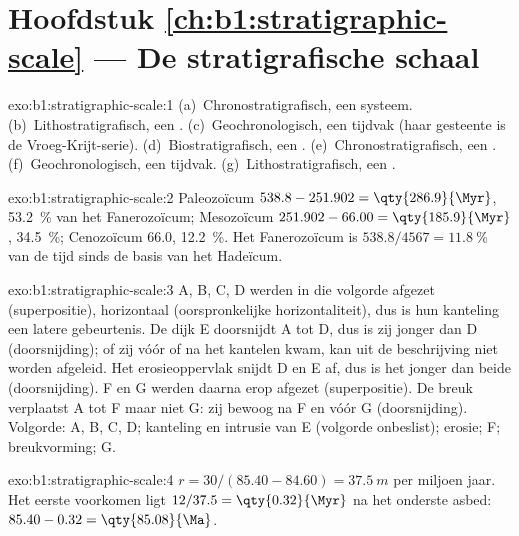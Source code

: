 \section*{Hoofdstuk \ref{ch:b1:stratigraphic-scale} --- De stratigrafische schaal}

\begin{solution}{exo:b1:stratigraphic-scale:1}
(a)~Chronostratigrafisch, een systeem. (b)~Lithostratigrafisch, een .
(c)~Geochronologisch, een tijdvak (haar gesteente is de Vroeg-Krijt-serie).
(d)~Biostratigrafisch, een . (e)~Chronostratigrafisch, een .
(f)~Geochronologisch, een tijdvak. (g)~Lithostratigrafisch, een .
\end{solution}

\begin{solution}{exo:b1:stratigraphic-scale:2}
Paleozoïcum $538.8 - 251.902 = \qty{286.9}{\Myr}$, \qty{53.2}{\%} van het
Fanerozoïcum; Mesozoïcum $251.902 - 66.00 = \qty{185.9}{\Myr}$, \qty{34.5}{\%};
Cenozoïcum \qty{66.0}{\Myr}, \qty{12.2}{\%}. Het Fanerozoïcum is
$538.8/4567 = \qty{11.8}{\%}$ van de tijd sinds de basis van het Hadeïcum.
\end{solution}

\begin{solution}{exo:b1:stratigraphic-scale:3}
A, B, C, D werden in die volgorde afgezet (superpositie), horizontaal (oorspronkelijke horizontaliteit), dus is hun kanteling een latere gebeurtenis. De dijk E doorsnijdt A tot D, dus is zij jonger dan D (doorsnijding); of zij vóór of na het kantelen kwam, kan uit de beschrijving niet worden afgeleid. Het erosieoppervlak snijdt D en E af, dus is het jonger dan beide (doorsnijding). F en G werden daarna erop afgezet (superpositie). De breuk verplaatst A tot F maar niet G: zij bewoog na F en vóór G (doorsnijding). Volgorde: A, B, C, D; kanteling en intrusie van E (volgorde onbeslist); erosie; F; breukvorming; G.
\end{solution}

\begin{solution}{exo:b1:stratigraphic-scale:4}
$r = 30/(85.40 - 84.60) = \qty{37.5}{m}$ per miljoen jaar. Het eerste voorkomen
ligt $12/37.5 = \qty{0.32}{\Myr}$ na het onderste asbed: $85.40 - 0.32 =
\qty{85.08}{\Ma}$.
\end{solution}

